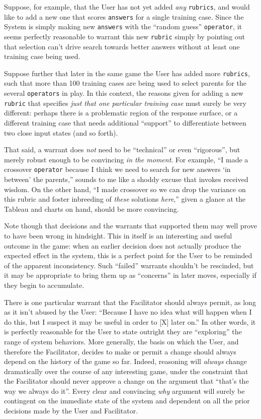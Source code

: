 Suppose, for example, that the User has not yet added \emph{any} \texttt{rubrics}, and would like to add a new one that scores \texttt{answers} for a single training case. Since the System is simply making new \texttt{answers} with the ``random guess'' \texttt{operator}, it seems perfectly reasonable to warrant this new \texttt{rubric} simply by pointing out that selection can't drive search towards better answers without at least one training case being used.

Suppose further that later in the same game the User has added more \texttt{rubrics}, such that more than 100 training cases are being used to select parents for the several \texttt{operators} in play. In this context, the reasons given for adding a new \texttt{rubric} that specifies \emph{just that one particular training case} must surely be very different: perhaps there is a problematic region of the response surface, or a different training case that needs additional ``support'' to differentiate between two close input states (and so forth).

That said, a warrant does \emph{not} need to be ``technical'' or even ``rigorous'', but merely robust enough to be convincing \emph{in the moment}. For example, ``I made a crossover \texttt{operator} because I think we need to search for new answers `in between' the parents,'' sounds to me like a shoddy excuse that invokes received wisdom. On the other hand, ``I made crossover so we can drop the variance on this rubric and foster inbreeding of \emph{these} solutions \emph{here},'' given a glance at the Tableau and charts on hand, should be more convincing.

Note though that decisions and the warrants that supported them may well prove to have been wrong in hindsight. This in itself is an interesting and useful outcome in the game: when an earlier decision does not actually produce the expected effect in the system, this is a perfect point for the User to be reminded of the apparent inconsistency. Such ``failed'' warrants shouldn't be rescinded, but it may be appropriate to bring them up as ``concerns'' in later moves, especially if they begin to accumulate.

There is one particular warrant that the Facilitator should always permit, as long as it isn't abused by the User: ``Because I have no idea what will happen when I do this, but I suspect it may be useful in order to [X] later on.'' In other words, it is perfectly reasonable for the User to state outright they are ``exploring'' the range of system behaviors. More generally, the basis on which the User, and therefore the Facilitator, decides to make or permit a change should always depend on the history of the game so far. Indeed,  reasoning will \emph{always} change dramatically over the course of any interesting game, under the constraint that the Facilitator should never approve a change on the argument that ``that's the way we always do it''. Every clear and convincing \emph{why} argument will surely be contingent on the immediate state of the system and dependent on all the prior decisions made by the User and Facilitator.


